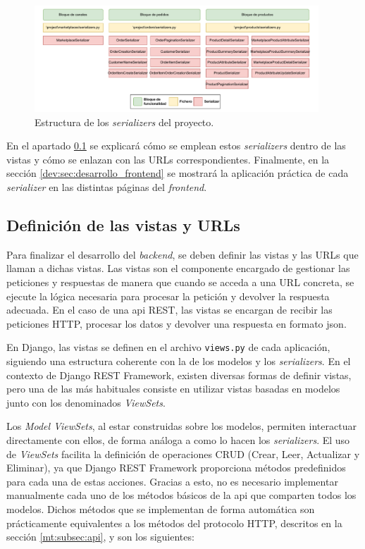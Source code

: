 \begin{figure}[H]
    \centering
    \includegraphics[width=0.95\textwidth]{figures/design_develop/estructura_serializers.pdf}
    \caption{Estructura de los \textit{serializers} del proyecto.}
    \label{dev:fig:estructura_serializers}
\end{figure}

En el apartado \ref{dev:subsec:definicion_vistas_urls} se explicará cómo se emplean estos \textit{serializers} dentro de las vistas y cómo se enlazan con las URLs correspondientes. Finalmente, en la sección \ref{dev:sec:desarrollo_frontend} se mostrará la aplicación práctica de cada \textit{serializer} en las distintas páginas del \textit{frontend}.

\subsection{Definición de las vistas y URLs}
\label{dev:subsec:definicion_vistas_urls}

Para finalizar el desarrollo del \textit{backend}, se deben definir las vistas y las URLs que llaman a dichas vistas. Las vistas son el componente encargado de gestionar las peticiones y respuestas de manera que cuando se acceda a una URL concreta, se ejecute la lógica necesaria para procesar la petición y devolver la respuesta adecuada. En el caso de una \gls{api} REST, las vistas se encargan de recibir las peticiones HTTP, procesar los datos y devolver una respuesta en formato \gls{json}.

En Django, las vistas se definen en el archivo \texttt{views.py} de cada aplicación, siguiendo una estructura coherente con la de los modelos y los \textit{serializers}. En el contexto de Django REST Framework, existen diversas formas de definir vistas, pero una de las más habituales consiste en utilizar vistas basadas en modelos junto con los denominados \textit{ViewSets}.

Los \textit{Model ViewSets}, al estar construidas sobre los modelos, permiten interactuar directamente con ellos, de forma análoga a como lo hacen los \textit{serializers}. El uso de \textit{ViewSets} facilita la definición de operaciones CRUD (Crear, Leer, Actualizar y Eliminar), ya que Django REST Framework proporciona métodos predefinidos para cada una de estas acciones. Gracias a esto, no es necesario implementar manualmente cada uno de los métodos básicos de la \gls{api} que comparten todos los modelos. Dichos métodos que se implementan de forma automática son prácticamente equivalentes a los métodos del protocolo HTTP, descritos en la sección \ref{mt:subsec:api}, y son los siguientes:


